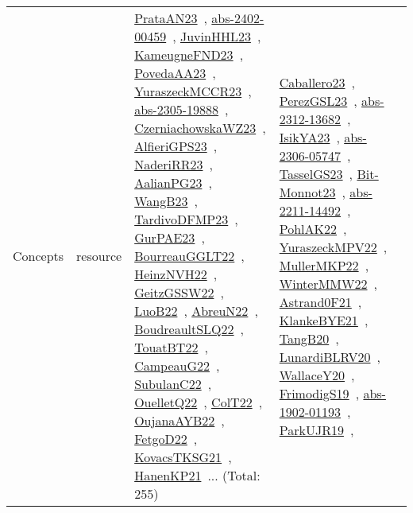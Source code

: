 {\begin{longtable}{lp{3cm}>{\raggedright\arraybackslash}p{6cm}>{\raggedright\arraybackslash}p{6cm}>{\raggedright\arraybackslash}p{8cm}}
Concepts & resource & \href{articles/PrataAN23.pdf}{PrataAN23}~\cite{PrataAN23}, \href{articles/abs-2402-00459.pdf}{abs-2402-00459}~\cite{abs-2402-00459}, \href{papers/JuvinHHL23.pdf}{JuvinHHL23}~\cite{JuvinHHL23}, \href{papers/KameugneFND23.pdf}{KameugneFND23}~\cite{KameugneFND23}, \href{papers/PovedaAA23.pdf}{PovedaAA23}~\cite{PovedaAA23}, \href{articles/YuraszeckMCCR23.pdf}{YuraszeckMCCR23}~\cite{YuraszeckMCCR23}, \href{articles/abs-2305-19888.pdf}{abs-2305-19888}~\cite{abs-2305-19888}, \href{articles/CzerniachowskaWZ23.pdf}{CzerniachowskaWZ23}~\cite{CzerniachowskaWZ23}, \href{articles/AlfieriGPS23.pdf}{AlfieriGPS23}~\cite{AlfieriGPS23}, \href{articles/NaderiRR23.pdf}{NaderiRR23}~\cite{NaderiRR23}, \href{papers/AalianPG23.pdf}{AalianPG23}~\cite{AalianPG23}, \href{papers/WangB23.pdf}{WangB23}~\cite{WangB23}, \href{papers/TardivoDFMP23.pdf}{TardivoDFMP23}~\cite{TardivoDFMP23}, \href{articles/GurPAE23.pdf}{GurPAE23}~\cite{GurPAE23}, \href{articles/BourreauGGLT22.pdf}{BourreauGGLT22}~\cite{BourreauGGLT22}, \href{articles/HeinzNVH22.pdf}{HeinzNVH22}~\cite{HeinzNVH22}, \href{papers/GeitzGSSW22.pdf}{GeitzGSSW22}~\cite{GeitzGSSW22}, \href{papers/LuoB22.pdf}{LuoB22}~\cite{LuoB22}, \href{articles/AbreuN22.pdf}{AbreuN22}~\cite{AbreuN22}, \href{papers/BoudreaultSLQ22.pdf}{BoudreaultSLQ22}~\cite{BoudreaultSLQ22}, \href{papers/TouatBT22.pdf}{TouatBT22}~\cite{TouatBT22}, \href{articles/CampeauG22.pdf}{CampeauG22}~\cite{CampeauG22}, \href{articles/SubulanC22.pdf}{SubulanC22}~\cite{SubulanC22}, \href{papers/OuelletQ22.pdf}{OuelletQ22}~\cite{OuelletQ22}, \href{articles/ColT22.pdf}{ColT22}~\cite{ColT22}, \href{papers/OujanaAYB22.pdf}{OujanaAYB22}~\cite{OujanaAYB22}, \href{articles/FetgoD22.pdf}{FetgoD22}~\cite{FetgoD22}, \href{papers/KovacsTKSG21.pdf}{KovacsTKSG21}~\cite{KovacsTKSG21}, \href{papers/HanenKP21.pdf}{HanenKP21}~\cite{HanenKP21}... (Total: 255) & \href{articles/Caballero23.pdf}{Caballero23}~\cite{Caballero23}, \href{papers/PerezGSL23.pdf}{PerezGSL23}~\cite{PerezGSL23}, \href{articles/abs-2312-13682.pdf}{abs-2312-13682}~\cite{abs-2312-13682}, \href{articles/IsikYA23.pdf}{IsikYA23}~\cite{IsikYA23}, \href{articles/abs-2306-05747.pdf}{abs-2306-05747}~\cite{abs-2306-05747}, \href{papers/TasselGS23.pdf}{TasselGS23}~\cite{TasselGS23}, \href{papers/Bit-Monnot23.pdf}{Bit-Monnot23}~\cite{Bit-Monnot23}, \href{articles/abs-2211-14492.pdf}{abs-2211-14492}~\cite{abs-2211-14492}, \href{articles/PohlAK22.pdf}{PohlAK22}~\cite{PohlAK22}, \href{articles/YuraszeckMPV22.pdf}{YuraszeckMPV22}~\cite{YuraszeckMPV22}, \href{articles/MullerMKP22.pdf}{MullerMKP22}~\cite{MullerMKP22}, \href{papers/WinterMMW22.pdf}{WinterMMW22}~\cite{WinterMMW22}, \href{papers/Astrand0F21.pdf}{Astrand0F21}~\cite{Astrand0F21}, \href{papers/KlankeBYE21.pdf}{KlankeBYE21}~\cite{KlankeBYE21}, \href{papers/TangB20.pdf}{TangB20}~\cite{TangB20}, \href{articles/LunardiBLRV20.pdf}{LunardiBLRV20}~\cite{LunardiBLRV20}, \href{articles/WallaceY20.pdf}{WallaceY20}~\cite{WallaceY20}, \href{papers/FrimodigS19.pdf}{FrimodigS19}~\cite{FrimodigS19}, \href{articles/abs-1902-01193.pdf}{abs-1902-01193}~\cite{abs-1902-01193}, \href{papers/ParkUJR19.pdf}{ParkUJR19}~\cite{ParkUJR19}, 
\end{longtable}}
